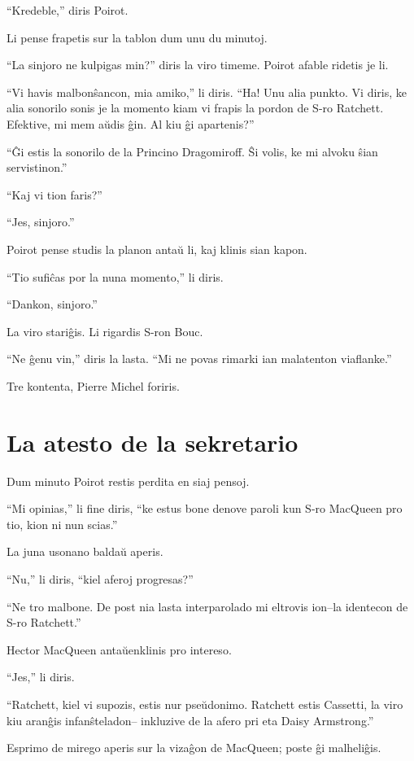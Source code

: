 ``Kredeble,'' diris Poirot.

Li pense frapetis sur la tablon dum unu du minutoj.

``La sinjoro ne kulpigas min?'' diris la viro timeme. Poirot afable ridetis je li.

``Vi havis malbonŝancon, mia amiko,'' li diris. ``Ha! Unu alia punkto. Vi diris, ke alia sonorilo sonis je la momento kiam vi frapis la pordon de S-ro Ratchett. Efektive, mi mem aŭdis ĝin. Al kiu ĝi apartenis?''

``Ĝi estis la sonorilo de la Princino Dragomiroff. Ŝi volis, ke mi alvoku ŝian servistinon.''

``Kaj vi tion faris?''

``Jes, sinjoro.''

Poirot pense studis la planon antaŭ li, kaj klinis sian kapon.

``Tio sufiĉas por la nuna momento,'' li diris.

``Dankon, sinjoro.''

La viro stariĝis. Li rigardis S-ron Bouc.

``Ne ĝenu vin,'' diris la lasta. ``Mi ne povas rimarki ian malatenton viaflanke.''

Tre kontenta, Pierre Michel foriris.

\chapter[La atesto de la sekretario]{La atesto de la sekretario}


Dum minuto Poirot restis perdita en siaj pensoj.

``Mi opinias,'' li fine diris, ``ke estus bone denove paroli kun S-ro MacQueen pro tio, kion ni nun scias.''

La juna usonano baldaŭ aperis.

``Nu,'' li diris, ``kiel aferoj progresas?''

``Ne tro malbone. De post nia lasta interparolado mi eltrovis ion--la identecon de S-ro Ratchett.''

Hector MacQueen antaŭenklinis pro intereso.

``Jes,'' li diris.

``Ratchett, kiel vi supozis, estis nur pseŭdonimo. Ratchett estis Cassetti, la viro kiu aranĝis infanŝteladon-- inkluzive de la afero pri eta Daisy Armstrong.''

Esprimo de mirego aperis sur la vizaĝon de MacQueen; poste ĝi malheliĝis.

